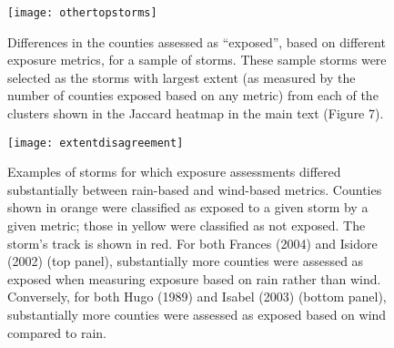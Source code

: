 \documentclass[11pt, titlepage, twoside]{article}
\begin{document}
\clearpage 

\begin{figure}[tbhp!]
\centering
\texttt{[image: othertopstorms]}
\caption{Differences in the counties assessed as ``exposed'', based on different
	exposure metrics, for a sample of storms. These sample storms were 
	selected as the  storms with largest extent (as measured by the 
	number of counties exposed based on any metric) from each of the 
	clusters shown in the Jaccard heatmap in the main text (Figure 7).}
\label{fig:othertopstorms}
\end{figure}

\clearpage

\begin{figure}[tbhp!]
\centering
\texttt{[image: extentdisagreement]}
\caption{Examples of storms for which exposure assessments differed
	substantially between rain-based and wind-based metrics. Counties 
	shown in orange were classified as exposed to a given storm by a 
	given metric; those in yellow were classified as not exposed. 
	The storm's track is shown in red. For both Frances (2004) and 
	Isidore (2002) (top panel), substantially more counties were assessed 
	as exposed when measuring exposure based on rain rather than wind. 
	Conversely, for both Hugo (1989) and Isabel (2003) (bottom panel), 
	substantially more counties were assessed as exposed based on wind 
	compared to rain.}
\label{fig:extentdisagreement}
\end{figure}

\clearpage

\printbibliography
\end{document}
